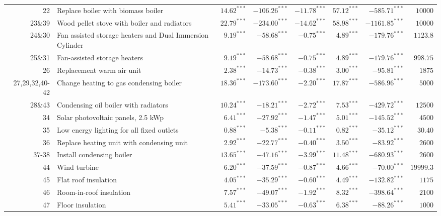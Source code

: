 \begin{table}[h!]
\begin{center}
{\begin{tabular}{r p{5cm} rrrrr | r}
22 & Replace boiler with biomass boiler  & $14.62^{***}$ & $-106.26^{***}$ & $-11.78^{***}$ & $57.12^{***}$ & $-585.71^{***}$ & $10000$\\ 
23\&39 & Wood pellet stove with boiler and radiators  & $22.79^{***}$ & $-234.00^{***}$ & $-14.62^{***}$ & $58.98^{***}$ & $-1161.85^{***}$ & $10000$\\ 
24\&30 & Fan assisted storage heaters and Dual Immersion Cylinder & $9.19^{***}$ & $-58.68^{***}$ & $-0.75^{***}$ & $4.89^{***}$ & $-179.76^{***}$ & $1123.8$\\ 
25\&31 & Fan-assisted storage heaters & $9.19^{***}$ & $-58.68^{***}$ & $-0.75^{***}$ & $4.89^{***}$ & $-179.76^{***}$ & $998.75$\\ 
26 & Replacement warm air unit & $2.38^{***}$ & $-14.73^{***}$ & $-0.38^{***}$ & $3.00^{***}$ & $-95.81^{***}$ & $1875$\\ 
27,29,32,40-42 & Change heating to gas condensing boiler & $18.36^{***}$ & $-173.60^{***}$ & $-2.20^{***}$ & $17.87^{***}$ & $-586.96^{***}$ & $5000$\\ 
28\&43 & Condensing oil boiler with radiators & $10.24^{***}$ & $-18.21^{***}$ & $-2.72^{***}$ & $7.53^{***}$ & $-429.72^{***}$ & $12500$\\ 
34 & Solar photovoltaic panels, 2.5 kWp  & $6.41^{***}$ & $-27.92^{***}$ & $-1.47^{***}$ & $5.01^{***}$ & $-145.52^{***}$ & $4500$\\ 
35 & Low energy lighting for all fixed outlets  & $0.88^{***}$ & $-5.38^{***}$ & $-0.11^{***}$ & $0.82^{***}$ & $-35.12^{***}$ & $30.40$\\ 
36 & Replace heating unit with condensing unit  & $2.92^{***}$ & $-22.77^{***}$ & $-0.40^{***}$ & $3.50^{***}$ & $-83.92^{***}$ & $2600$ \\ 
37-38 & Install condensing boiler  & $13.65^{***}$ & $-47.16^{***}$ & $-3.99^{***}$ & $11.48^{***}$ & $-680.93^{***}$ & $2600$\\ 
44 & Wind turbine & $6.20^{***}$ & $-37.59^{***}$ & $-0.87^{***}$ & $4.66^{***}$ & $-70.00^{***}$ & $19999.3$\\ 
45 & Flat roof insulation  & $4.05^{***}$ & $-35.29^{***}$ & $-0.60^{***}$ & $4.49^{***}$ & $-132.82^{***}$ & $1175$\\ 
46 & Room-in-roof insulation & $7.57^{***}$ & $-49.07^{***}$ & $-1.92^{***}$ & $8.32^{***}$ & $-398.64^{***}$ & $2100$\\ 
47 & Floor insulation & $5.41^{***}$ & $-33.05^{***}$ & $-0.63^{***}$ & $6.38^{***}$ & $-88.26^{***}$ & $1000$\\ 

\end{tabular}}
\end{center}
\end{table}
